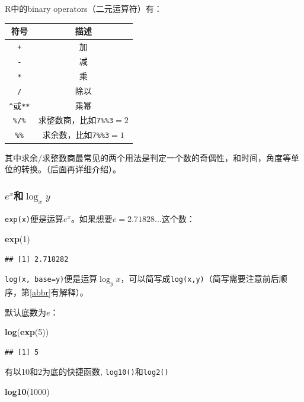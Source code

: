 \documentclass[]{book}
\newenvironment{Shaded}{\begin{snugshade}}{\end{snugshade}}
\newcommand{\DecValTok}[1]{\textcolor[rgb]{0.00,0.00,0.81}{#1}}
\newcommand{\KeywordTok}[1]{\textcolor[rgb]{0.13,0.29,0.53}{\textbf{#1}}}
\newcommand{\NormalTok}[1]{#1}
\begin{document}
R中的binary operators（二元运算符）有：

\begin{longtable}[]{@{}cc@{}}
\toprule
符号 & 描述\tabularnewline
\midrule
\endhead
\texttt{+} & 加\tabularnewline
\texttt{-} & 减\tabularnewline
\texttt{*} & 乘\tabularnewline
\texttt{/} & 除以\tabularnewline
\texttt{\^{}}或\texttt{**} & 乘幂\tabularnewline
\texttt{\%/\%} & 求整数商，比如\texttt{7\%\%3}\(=2\)\tabularnewline
\texttt{\%\%} & 求余数，比如\texttt{7\%\%3}\(=1\)\tabularnewline
\bottomrule
\end{longtable}

其中求余/求整数商最常见的两个用法是判定一个数的奇偶性，和时间，角度等单位的转换。（后面再详细介绍）。

\hypertarget{exlog_xy}{%
\subsubsection{\texorpdfstring{\(e^x\)和\(\log_x{y}\)}{e\^{}x和\textbackslash{}log\_x\{y\}}}\label{exlog_xy}}

\texttt{exp(x)}便是运算\(e^x\)。如果想要\(e=2.71828...\)这个数：

\begin{Shaded}
\begin{Highlighting}[]
\KeywordTok{exp}\NormalTok{(}\DecValTok{1}\NormalTok{)}
\end{Highlighting}
\end{Shaded}

\begin{verbatim}
## [1] 2.718282
\end{verbatim}

\texttt{log(x,\ base=y)}便是运算\(\log_y{x}\)，可以简写成\texttt{log(x,y)}（简写需要注意前后顺序，第\ref{abbr}有解释）。

默认底数为\(e\)：

\begin{Shaded}
\begin{Highlighting}[]
\KeywordTok{log}\NormalTok{(}\KeywordTok{exp}\NormalTok{(}\DecValTok{5}\NormalTok{))}
\end{Highlighting}
\end{Shaded}

\begin{verbatim}
## [1] 5
\end{verbatim}

有以10和2为底的快捷函数, \texttt{log10()}和\texttt{log2()}

\begin{Shaded}
\begin{Highlighting}[]
\KeywordTok{log10}\NormalTok{(}\DecValTok{1000}\NormalTok{)}
\end{Highlighting}
\end{Shaded}
\end{document}
